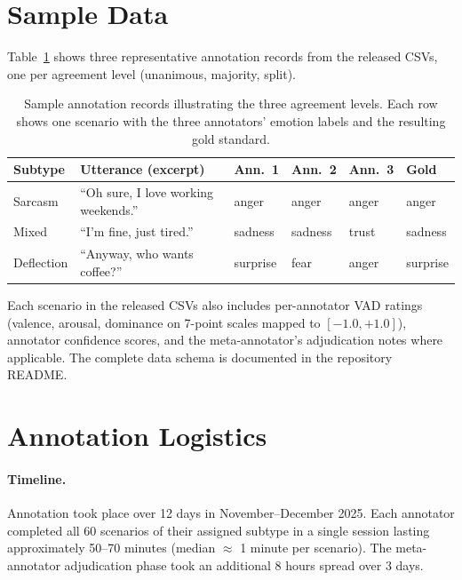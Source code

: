 \documentclass[twoside,11pt]{article}
\begin{document}
\section{Sample Data}
\label{app:sample-data}

Table~\ref{tab:sample-data} shows three representative annotation records from the released CSVs, one per agreement level (unanimous, majority, split).

\begin{table}[ht]
\centering
\caption{Sample annotation records illustrating the three agreement levels. Each row shows one scenario with the three annotators' emotion labels and the resulting gold standard.}
\label{tab:sample-data}
\small
\begin{tabular}{@{}p{1.3cm}p{4.5cm}p{1.3cm}p{1.3cm}p{1.3cm}p{1.2cm}@{}}
\toprule
\textbf{Subtype} & \textbf{Utterance (excerpt)} & \textbf{Ann.~1} & \textbf{Ann.~2} & \textbf{Ann.~3} & \textbf{Gold} \\
\midrule
Sarcasm & ``Oh sure, I love working weekends.'' & anger & anger & anger & anger \\
\addlinespace
Mixed & ``I'm fine, just tired.'' & sadness & sadness & trust & sadness \\
\addlinespace
Deflection & ``Anyway, who wants coffee?'' & surprise & fear & anger & surprise \\
\bottomrule
\end{tabular}
\end{table}

Each scenario in the released CSVs also includes per-annotator VAD ratings (valence, arousal, dominance on 7-point scales mapped to $[-1.0, +1.0]$), annotator confidence scores, and the meta-annotator's adjudication notes where applicable. The complete data schema is documented in the repository README.

\section{Annotation Logistics}
\label{app:logistics}

\paragraph{Timeline.} Annotation took place over 12 days in November--December 2025. Each annotator completed all 60 scenarios of their assigned subtype in a single session lasting approximately 50--70 minutes (median $\approx$ 1 minute per scenario). The meta-annotator adjudication phase took an additional 8 hours spread over 3 days.
\end{document}

